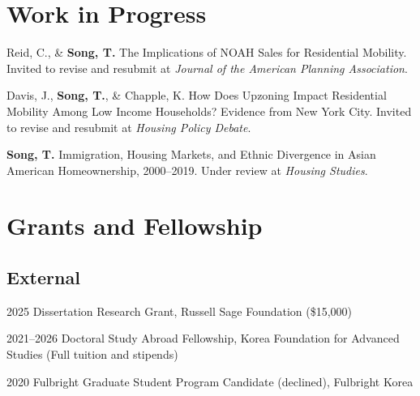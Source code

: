 \documentclass[11pt,letterpaper]{article}
\newcommand{\money}[1]{(\$#1)}
\newcommand{\term}[1]{(#1)}
\begin{document}
\section{Work in Progress}
\begin{subpoints}
  \item Reid, C., \& \textbf{Song, T.} The Implications of NOAH Sales for Residential Mobility. Invited to revise and resubmit at \emph{Journal of the American Planning Association}.
  \item Davis, J., \textbf{Song, T.}, \& Chapple, K. How Does Upzoning Impact Residential Mobility Among Low Income Households? Evidence from New York City. Invited to revise and resubmit at \emph{Housing Policy Debate}.
  \item \textbf{Song, T.} Immigration, Housing Markets, and Ethnic Divergence in Asian American Homeownership, 2000–2019. Under review at \emph{Housing Studies}.
\end{subpoints}

\section{Grants and Fellowship}

\subsection{External}
\begin{tablist}
  \item[2025] \tab{}Dissertation Research Grant, Russell Sage Foundation \money{15,000}
  \item[2021–2026] \tab{}Doctoral Study Abroad Fellowship, Korea Foundation for Advanced Studies \term{Full tuition and stipends}
  \item[2020] \tab{}Fulbright Graduate Student Program Candidate \term{declined}, Fulbright Korea
\end{tablist}
\end{document}

